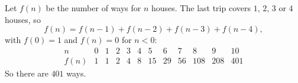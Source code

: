Let $f(n)$ be the number of ways for $n$ houses. The last trip covers $1$, $2$, $3$ or $4$ houses, so
\[f(n)=f(n-1)+f(n-2)+f(n-3)+f(n-4),\]
with $f(0)=1$ and $f(n)=0$ for $n<0$:
\[\begin{array}{c|ccccccccccc}n&0&1&2&3&4&5&6&7&8&9&10\\ \hline f(n)&1&1&2&4&8&15&29&56&108&208&401\end{array}\]
So there are $\boxed{401}$ ways.
